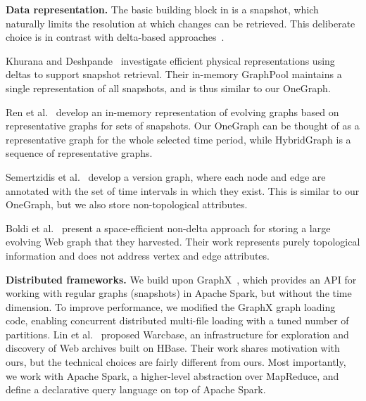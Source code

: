 {\bf Data representation.}  The basic building block in \ql is a
snapshot, which naturally limits the resolution at which changes can
be retrieved. This deliberate choice is in contrast with delta-based
approaches~\cite{Khurana2013,Koloniari2012,DBLP:journals/tos/MiaoHLWYZPCC15}.

Khurana and Deshpande~\cite{Khurana2013} investigate efficient
physical representations using deltas to support snapshot retrieval.
Their in-memory GraphPool maintains a single representation of all
snapshots, and is thus similar to our OneGraph.

Ren et al.~\cite{Ren2011} develop an in-memory representation of
evolving graphs based on representative graphs for sets of snapshots.
Our OneGraph can be thought of as a representative graph for the whole
selected time period, while HybridGraph is a sequence of
representative graphs.

Semertzidis et al.~\cite{Semertzidis2015} develop a version graph,
where each node and edge are annotated with the set of time intervals
in which they exist.  This is similar to our OneGraph, but we also
store non-topological attributes.

Boldi et al.~\cite{Boldi2008} present a space-efficient non-delta
approach for storing a large evolving Web graph that they harvested.
Their work represents purely topological information and does not
address vertex and edge attributes.

{\bf Distributed frameworks.}  We build upon
GraphX~\cite{DBLP:conf/osdi/GonzalezXDCFS14}, which provides an API
for working with regular graphs (snapshots) in Apache Spark, but
without the time dimension.  To improve performance, we modified the
GraphX graph loading code, enabling concurrent distributed multi-file
loading with a tuned number of partitions.  Lin et
al.~\cite{DBLP:conf/www/LinGR14} proposed Warcbase, an infrastructure
for exploration and discovery of Web archives built on HBase.  Their
work shares motivation with ours, but the technical choices are fairly
different from ours.  Most importantly, we work with Apache Spark, a
higher-level abstraction over MapReduce, and define a declarative
query language on top of Apache Spark.

